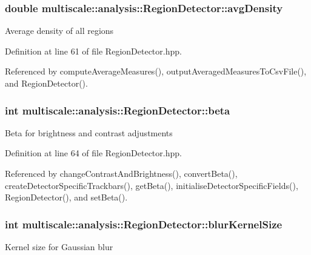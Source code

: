 \hypertarget{classmultiscale_1_1analysis_1_1RegionDetector_a96d0cab2a5cd61b3820c87581fed9548}{
\subsubsection[{avg\-Density}]{\setlength{\rightskip}{0pt plus 5cm}double multiscale\-::analysis\-::\-Region\-Detector\-::avg\-Density\hspace{0.3cm}{\ttfamily [private]}}}\label{classmultiscale_1_1analysis_1_1RegionDetector_a96d0cab2a5cd61b3820c87581fed9548}
Average density of all regions 

Definition at line 61 of file Region\-Detector.\-hpp.



Referenced by compute\-Average\-Measures(), output\-Averaged\-Measures\-To\-Csv\-File(), and Region\-Detector().

\hypertarget{classmultiscale_1_1analysis_1_1RegionDetector_a23c831170c2264dd7e59067a1a7d3c8e}{
\subsubsection[{beta}]{\setlength{\rightskip}{0pt plus 5cm}int multiscale\-::analysis\-::\-Region\-Detector\-::beta\hspace{0.3cm}{\ttfamily [private]}}}\label{classmultiscale_1_1analysis_1_1RegionDetector_a23c831170c2264dd7e59067a1a7d3c8e}
Beta for brightness and contrast adjustments 

Definition at line 64 of file Region\-Detector.\-hpp.



Referenced by change\-Contrast\-And\-Brightness(), convert\-Beta(), create\-Detector\-Specific\-Trackbars(), get\-Beta(), initialise\-Detector\-Specific\-Fields(), Region\-Detector(), and set\-Beta().

\hypertarget{classmultiscale_1_1analysis_1_1RegionDetector_aae6ee0ec7f0a610dd8a906c1eb181bc7}{
\subsubsection[{blur\-Kernel\-Size}]{\setlength{\rightskip}{0pt plus 5cm}int multiscale\-::analysis\-::\-Region\-Detector\-::blur\-Kernel\-Size\hspace{0.3cm}{\ttfamily [private]}}}\label{classmultiscale_1_1analysis_1_1RegionDetector_aae6ee0ec7f0a610dd8a906c1eb181bc7}
Kernel size for Gaussian blur 

